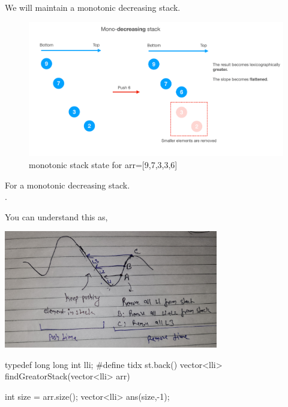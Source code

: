 \begin{solution}[Stack | $O(n)$]
    We will maintain a monotonic decreasing stack.
   
    \begin{figure}[ht]
        \includegraphics[width=\textwidth]{./resources/mono-decreasing-stack.png}
        \caption{monotonic stack state for arr=[9,7,3,3,6]}

    \end{figure}
        
    For a monotonic decreasing stack.\\
    \faHandPointRight\hspace{2mm}{we push array element to stack if current element is smaller than stack tidx}.\\
    \faHandPointRight\hspace{2mm}{we pop a element from stack if current element is greator than stack tidx.}
   
    You can understand this as, 

    \includegraphics[width=0.7\textwidth]{./resources/monotonic-decreasing-stack.jpg}

    \begin{code3}
        typedef long long int lli;
        #define tidx st.back()
        vector<lli> findGreatorStack(vector<lli> arr)
        {
            int size = arr.size();
            vector<lli> ans(size,-1);
            
}
\end{code3}
\end{solution}
